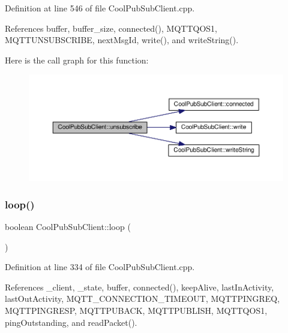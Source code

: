 Definition at line 546 of file Cool\+Pub\+Sub\+Client.\+cpp.



References buffer, buffer\+\_\+size, connected(), M\+Q\+T\+T\+Q\+O\+S1, M\+Q\+T\+T\+U\+N\+S\+U\+B\+S\+C\+R\+I\+BE, next\+Msg\+Id, write(), and write\+String().

Here is the call graph for this function\+:
\nopagebreak
\begin{figure}[H]
\begin{center}
\leavevmode
\includegraphics[width=350pt]{d8/d4b/class_cool_pub_sub_client_a850554280e314d6b5c33c73fd9e809fc_cgraph}
\end{center}
\end{figure}
\mbox{\label{class_cool_pub_sub_client_afc15900f0fc4886a19394508e61793b8}} 
\subsubsection{\texorpdfstring{loop()}{loop()}}
{\footnotesize\ttfamily boolean Cool\+Pub\+Sub\+Client\+::loop (\begin{DoxyParamCaption}{ }\end{DoxyParamCaption})}



Definition at line 334 of file Cool\+Pub\+Sub\+Client.\+cpp.



References \+\_\+client, \+\_\+state, buffer, connected(), keep\+Alive, last\+In\+Activity, last\+Out\+Activity, M\+Q\+T\+T\+\_\+\+C\+O\+N\+N\+E\+C\+T\+I\+O\+N\+\_\+\+T\+I\+M\+E\+O\+UT, M\+Q\+T\+T\+P\+I\+N\+G\+R\+EQ, M\+Q\+T\+T\+P\+I\+N\+G\+R\+E\+SP, M\+Q\+T\+T\+P\+U\+B\+A\+CK, M\+Q\+T\+T\+P\+U\+B\+L\+I\+SH, M\+Q\+T\+T\+Q\+O\+S1, ping\+Outstanding, and read\+Packet().



